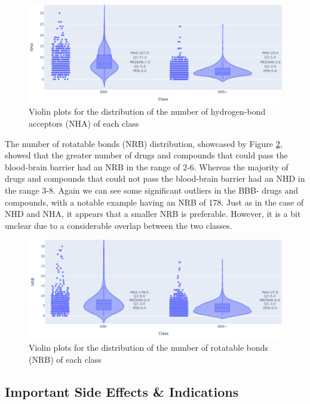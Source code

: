 \newpage

\begin{figure}[!ht]
    \centering
    \includegraphics[width=0.9\linewidth]{images/NHA Ranges.pdf}    

    \caption{Violin plots for the distribution of the number of hydrogen-bond acceptors (NHA) of each class}

    \label{fig:NHA_Ranges} 
\end{figure}

The number of rotatable bonds (NRB) distribution, showcased by Figure \ref{fig:NRB_Ranges}, showed that the greater number of drugs and compounds that could pass the blood-brain barrier had an NRB in the range of 2-6. Whereas the majority of drugs and compounds that could not pass the blood-brain barrier had an NHD in the range 3-8. Again we can see some significant outliers in the BBB- drugs and compounds, with a notable example having an NRB of 178. Just as in the case of NHD and NHA, it appears that a smaller NRB is preferable. However, it is a bit unclear due to a considerable overlap between the two classes.

\begin{figure}[!ht]
    \centering
    \includegraphics[width=0.9\linewidth]{images/NRB Ranges.pdf}    

    \caption{Violin plots for the distribution of the number of rotatable bonds (NRB) of each class}

    \label{fig:NRB_Ranges} 
\end{figure}

\subsection{Important Side Effects \& Indications}

